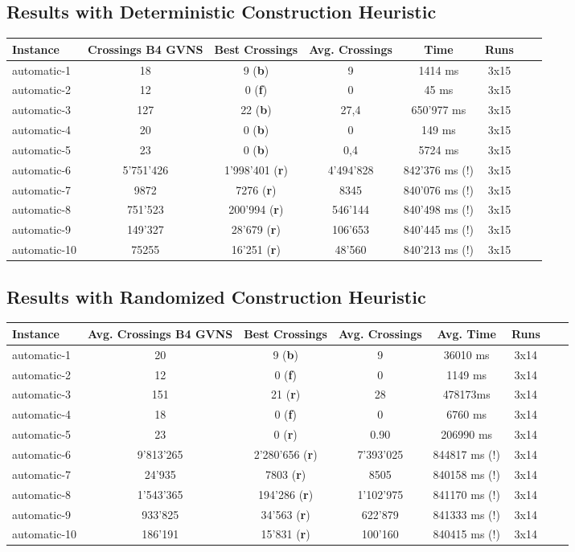 \documentclass[11pt]{article}
\begin{document}
\subsection{Results with Deterministic Construction Heuristic}


\begin{tabular}{l*{6}{c}r}
	Instance & Crossings B4 GVNS & Best Crossings & Avg. Crossings & Time & Runs \\
	\hline
	automatic-1 & 18 & 9 (\textbf{b}) & 9 & 1414 ms & 3x15 \\
	automatic-2 & 12 & 0 (\textbf{f}) & 0 & 45 ms & 3x15 \\
	automatic-3 & 127 & 22 (\textbf{b}) & 27,4 & 650'977 ms & 3x15 \\
	automatic-4 & 20 & 0 (\textbf{b}) & 0 & 149 ms & 3x15 \\
	automatic-5 & 23 & 0 (\textbf{b}) & 0,4 & 5724 ms & 3x15 \\
	automatic-6 & 5'751'426 & 1'998'401 (\textbf{r}) & 4'494'828 & 842'376 ms (!) & 3x15 \\
	automatic-7 & 9872 & 7276 (\textbf{r}) & 8345 & 840'076 ms (!) & 3x15 \\
	automatic-8 & 751'523 & 200'994 (\textbf{r}) & 546'144 & 840'498 ms (!) & 3x15  \\
	automatic-9 & 149'327 & 28'679 (\textbf{r}) & 106'653 & 840'445 ms (!) & 3x15 \\
	automatic-10 & 75255 & 16'251 (\textbf{r}) & 48'560 & 840'213 ms (!) & 3x15  \\
\end{tabular}



\subsection{Results with Randomized Construction Heuristic}

\begin{tabular}{l*{6}{c}r}
	Instance & Avg. Crossings B4 GVNS & Best Crossings & Avg. Crossings & Avg. Time & Runs\\
	\hline
	automatic-1 & 20 & 9 (\textbf{b}) & 9 & 36010 ms & 3x14 \\
	automatic-2 & 12 & 0 (\textbf{f})& 0 & 1149 ms & 3x14 \\
	automatic-3 & 151 & 21 (\textbf{r})& 28 & 478173ms & 3x14 \\
	automatic-4 & 18 & 0 (\textbf{f})& 0 & 6760 ms & 3x14 \\
	automatic-5 & 23 & 0 (\textbf{r})& 0.90 & 206990 ms & 3x14 \\
	automatic-6 & 9'813'265 &2'280'656 (\textbf{r})& 7'393'025 & 844817 ms (!) & 3x14 \\
	automatic-7 & 24'935 & 7803 (\textbf{r})& 8505 & 840158 ms (!) & 3x14 \\
	automatic-8 & 1'543'365 & 194'286 (\textbf{r})& 1'102'975 & 841170 ms (!) & 3x14 \\
	automatic-9 & 933'825 & 34'563 (\textbf{r})& 622'879 & 841333 ms (!) & 3x14 \\
	automatic-10 & 186'191 &15'831 (\textbf{r})& 100'160 & 840415 ms (!)  & 3x14 \\
\end{tabular}
\end{document}
